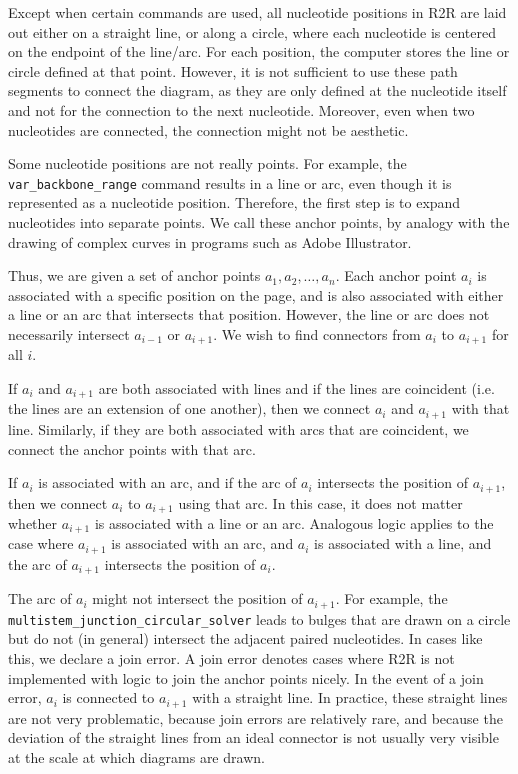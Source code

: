 \documentclass[letterpaper,12pt]{report}
\begin{document}
Except when certain commands are used, all nucleotide positions in R2R are laid out either on a straight line, or along a circle, where each nucleotide is centered on the endpoint of the line/arc. For each position, the computer stores the line or circle defined at that point. However, it is not sufficient to use these path segments to connect the diagram, as they are only defined at the nucleotide itself and not for the connection to the next nucleotide.  Moreover, even when two nucleotides are connected, the connection might not be aesthetic.

Some nucleotide positions are not really points.  For example, the {\tt var\_backbone\_range} command results in a line or arc, even though it is represented as a nucleotide position.  Therefore, the first step is to expand nucleotides into separate points.  We call these anchor points, by analogy with the drawing of complex curves in programs such as Adobe Illustrator.

Thus, we are given a set of anchor points $a_1,a_2,\ldots,a_n$.  Each anchor point $a_i$ is associated with a specific position on the page, and is also associated with either a line or an arc that intersects that position.  However, the line or arc does not necessarily intersect $a_{i-1}$ or $a_{i+1}$.
We wish to find connectors from $a_i$ to $a_{i+1}$ for all $i$.

If $a_i$ and $a_{i+1}$ are both associated with lines and if the lines are coincident (i.e. the lines are an extension of one another), then we connect $a_i$ and $a_{i+1}$ with that line.  Similarly, if they are both associated with arcs that are coincident, we connect the anchor points with that arc.

If $a_i$ is associated with an arc, and if the arc of $a_i$ intersects the position of $a_{i+1}$, then we connect $a_i$ to $a_{i+1}$ using that arc.  In this case, it does not matter whether $a_{i+1}$ is associated with a line or an arc.  Analogous logic applies to the case where $a_{i+1}$ is associated with an arc, and $a_i$ is associated with a line, and the arc of $a_{i+1}$ intersects the position of $a_i$.

The arc of $a_i$ might not intersect the position of $a_{i+1}$.  For example, the {\tt multistem\_junction\_circular\_solver} leads to bulges that are drawn on a circle but do not (in general) intersect the adjacent paired nucleotides.  In cases like this, we declare a join error.  A join error denotes cases where R2R is not implemented with logic to join the anchor points nicely.  In the event of a join error, $a_i$ is connected to $a_{i+1}$ with a straight line.  In practice, these straight lines are not very problematic, because join errors are relatively rare, and because the deviation of the straight lines from an ideal connector is not usually very visible at the scale at which diagrams are drawn.
\end{document}
